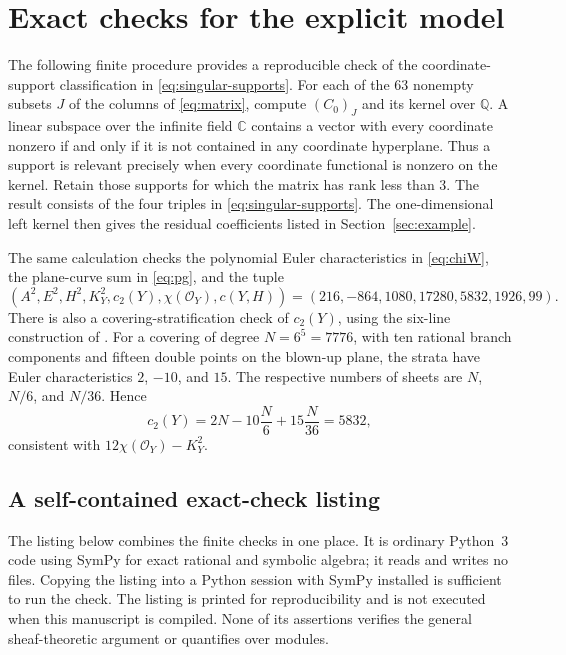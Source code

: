 \documentclass[11pt,reqno]{amsart}
\numberwithin{equation}{section}
\theoremstyle{definition}
\theoremstyle{remark}
\newcommand{\C}{\mathbb C}
\newcommand{\OO}{\mathcal O}
\begin{document}
\appendix
\section{Exact checks for the explicit model}\label{app:checks}

The following finite procedure provides a reproducible check of the
coordinate-support classification in \eqref{eq:singular-supports}.
For each of the $63$ nonempty subsets $J$ of the columns of
\eqref{eq:matrix}, compute $(C_0)_J$ and its kernel over $\mathbb Q$.
A linear subspace over the infinite field $\C$ contains a vector with
every coordinate nonzero if and only if it is not contained in any
coordinate hyperplane. Thus a support is relevant precisely when every
coordinate functional is nonzero on the kernel. Retain those supports
for which the matrix has rank less than $3$. The result consists of the
four triples in \eqref{eq:singular-supports}. The one-dimensional left
kernel then gives the residual coefficients listed in
Section~\ref{sec:example}.

The same calculation checks the polynomial Euler characteristics in
\eqref{eq:chiW}, the plane-curve sum in \eqref{eq:pg}, and the tuple
\[
 (A^2,E^2,H^2,K_Y^2,c_2(Y),\chi(\OO_Y),c(Y,H))
 =(216,-864,1080,17280,5832,1926,99).
\]
There is also a covering-stratification check of $c_2(Y)$, using the
six-line construction of \cite[Section 2.2]{Hirzebruch1983}. For a
covering of degree $N=6^5=7776$, with ten rational branch components
and fifteen double points on the blown-up plane, the strata have
Euler characteristics $2$, $-10$, and $15$. The respective numbers
of sheets are $N$, $N/6$, and $N/36$. Hence
\[
 c_2(Y)=2N-10\frac N6+15\frac N{36}=5832,
\]
consistent with $12\chi(\OO_Y)-K_Y^2$.

\subsection*{A self-contained exact-check listing}
The listing below combines the finite checks in one place. It is ordinary
Python~3 code using SymPy for exact rational and symbolic algebra; it
reads and writes no files. Copying the listing into a Python session
with SymPy installed is sufficient to run the check. The listing is
printed for reproducibility and is not executed when this manuscript
is compiled. None of its assertions verifies the general
sheaf-theoretic argument or quantifies over modules.
\end{document}

